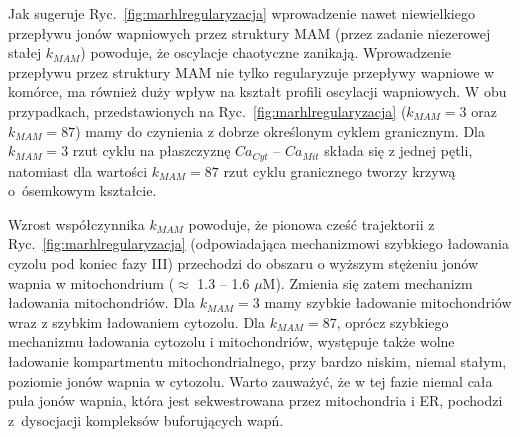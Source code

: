 Jak sugeruje Ryc.~\ref{fig:marhlregularyzacja} wprowadzenie nawet niewielkiego przepływu jonów wapniowych przez struktury MAM (przez zadanie niezerowej stałej $k_{MAM}$) powoduje, że oscylacje chaotyczne zanikają. Wprowadzenie przepływu  przez struktury MAM nie tylko regularyzuje przepływy wapniowe w komórce, ma również duży wpływ na kształt profili oscylacji wapniowych. W obu przypadkach, przedstawionych na Ryc.~\ref{fig:marhlregularyzacja} ($k_{MAM} = 3$ oraz $k_{MAM} = 87$) mamy do czynienia z dobrze określonym cyklem granicznym. Dla $k_{MAM} = 3$  rzut cyklu na płaszczyznę $Ca_{Cyt}$ -- $Ca_{Mit}$ składa się z jednej pętli, natomiast dla wartości $k_{MAM} = 87$ rzut cyklu granicznego tworzy krzywą o~ósemkowym kształcie. 

Wzrost współczynnika $k_{MAM}$ powoduje, że pionowa cześć trajektorii z Ryc.~\ref{fig:marhlregularyzacja} (odpowiadająca mechanizmowi szybkiego ładowania cyzolu pod koniec fazy III) przechodzi do obszaru o wyższym stężeniu jonów wapnia w mitochondrium ($\approx$ 1.3 -- 1.6 $\mu$M). Zmienia się zatem mechanizm ładowania mitochondriów. Dla $k_{MAM} = 3$ mamy szybkie ładowanie mitochondriów wraz z szybkim ładowaniem cytozolu. Dla $k_{MAM} = 87$, oprócz szybkiego mechanizmu ładowania cytozolu i mitochondriów, występuje także wolne ładowanie kompartmentu mitochondrialnego, przy bardzo niskim, niemal stałym, poziomie jonów wapnia w cytozolu. Warto zauważyć, że w tej fazie niemal cała pula jonów wapnia, która jest sekwestrowana przez mitochondria i ER, pochodzi z~dysocjacji  kompleksów buforujących wapń.


